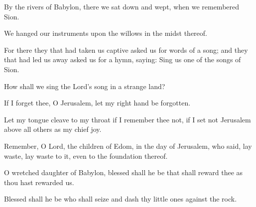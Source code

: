 By the rivers of Babylon, there we sat down and wept, when we remembered Sion.

We hanged our instruments upon the willows in the midst thereof.

For there they that had taken us captive asked us for words of a song; and they that had led us away asked us for a hymn, saying: Sing us one of the songs of Sion.

How shall we sing the Lord's song in a strange land?

If I forget thee, O Jerusalem, let my right hand be forgotten.

Let my tongue cleave to my throat if I remember thee not, if I set not Jerusalem above all others as my chief joy.

Remember, O Lord, the children of Edom, in the day of Jerusalem, who said, lay waste, lay waste to it, even to the foundation thereof.

O wretched daughter of Babylon, blessed shall he be that shall reward thee as thou hast rewarded us.

Blessed shall he be who shall seize and dash thy little ones against the rock.
